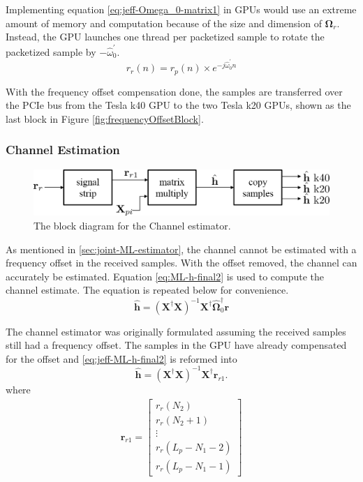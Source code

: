 Implementing equation \eqref{eq:jeff-Omega_0-matrix1} in GPUs would use an extreme amount of memory and computation because of the size and dimension of $\boldsymbol{\Omega}_r$.
Instead, the GPU launches one thread per packetized sample to rotate the packetized sample by $-\hat{\omega}^\prime_0$.
\begin{equation}
r_r(n) = r_p(n) \times e^{-j \hat{\omega}^\prime_0 n}
\end{equation}

With the frequency offset compensation done, the samples are transferred over the PCIe bus from the Tesla k40 GPU to the two Tesla k20 GPUs, shown as the last block in Figure \ref{fig:frequencyOffsetBlock}.


\subsubsection{Channel Estimation}
\begin{figure}
	\centering\includegraphics[width=\textwidth/10*8]{figures/gpu/channelBlock.png}
	\caption{The block diagram for the Channel estimator.}
	\label{fig:channelBlock}
\end{figure}
As mentioned in \ref{sec:joint-ML-estimator}, the channel cannot be estimated with a frequency offset in the received samples.
With the offset removed, the channel can accurately be estimated.
Equation \eqref{eq:ML-h-final2} is used to compute the channel estimate.
The equation is repeated below for convenience.
\begin{equation}
	\hat{\mathbf{h}} = \left( \mathbf{X}^\dag\mathbf{X} \right)^{-1} \mathbf{X}^\dag\hat{\boldsymbol{\Omega}}_0^\dag \mathbf{r}
\label{eq:jeff-ML-h-final2}
\end{equation}

The channel estimator was originally formulated assuming the received samples still had a frequency offset.
The samples in the GPU have already compensated for the offset and \eqref{eq:jeff-ML-h-final2} is reformed into
\begin{equation}
	\hat{\mathbf{h}} = \left( \mathbf{X}^\dag\mathbf{X} \right)^{-1} \mathbf{X}^\dag \mathbf{r}_{r1}.
\label{eq:channel_reformed_no_freq}
\end{equation}
where
\begin{align}
\mathbf{r}_{r1}
=     
\begin{bmatrix}
r_r(N_2) 		\\
r_r(N_2+1) 		\\
\vdots			\\
r_r(L_p - N_1 - 2)\\
r_r(L_p - N_1 - 1)
\end{bmatrix}
\end{align}


